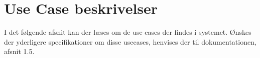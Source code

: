 \section{Use Case beskrivelser}

I det følgende afsnit kan der læses om de use cases der findes i systemet. Ønskes der yderligere specifikationer om disse usecases, henvises der til dokumentationen, afsnit 1.5. \\








